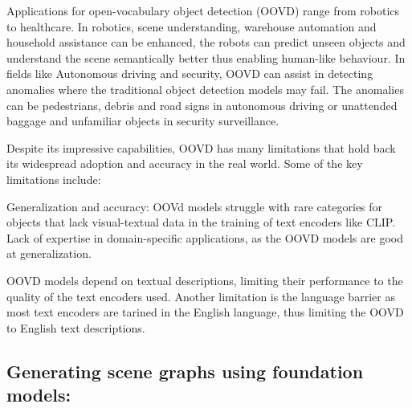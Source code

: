 Applications for open-vocabulary object detection (OOVD) range from robotics to healthcare. In robotics, scene understanding, warehouse automation and household
assistance can be enhanced, the robots can predict unseen objects and understand the scene semantically better thus enabling human-like behaviour. In fields like Autonomous 
driving and security, OOVD can assist in detecting anomalies where the traditional object detection models may fail. The anomalies can be pedestrians, debris and
 road signs in autonomous driving or unattended baggage and unfamiliar objects in security surveillance.

 Despite its impressive capabilities, OOVD has many limitations that hold back its widespread adoption and accuracy in the real world. Some of the key limitations 
 include:
 \begin{compactenum}[1.]
    \item Generalization and accuracy: OOVd models struggle with rare categories for objects that lack visual-textual data in the training of text encoders like
    CLIP. Lack of expertise in domain-specific applications, as the OOVD models are good at generalization. 
    \item OOVD models depend on textual descriptions, limiting their performance to the quality of the text encoders used. Another limitation is the 
     language barrier as most text encoders are tarined in the English language, thus limiting the OOVD to English text descriptions. 
 \end{compactenum}
\subsection{Generating scene graphs using foundation models:}
